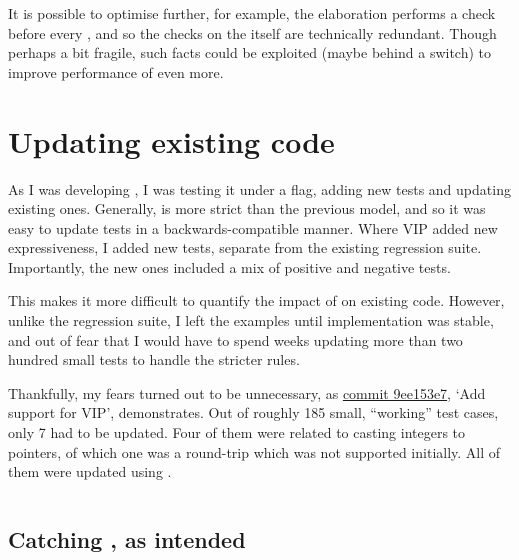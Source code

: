 It is possible to optimise further, for example, the  elaboration
performs a  check before every
, and so the checks on the 
itself are technically redundant. Though perhaps a bit fragile, such facts
could be exploited (maybe behind a switch) to improve performance of
 even more.

\section{Updating existing code}

As I was developing , I was testing it under a flag, adding new
tests and updating existing ones. Generally,  is more strict than
the previous model, and so it was easy to update tests in a
backwards-compatible manner. Where VIP added new expressiveness, I added new
tests, separate from the existing regression suite. Importantly, the new ones
included a mix of positive and negative tests.

This makes it more difficult to quantify the impact of  on existing
code. However, unlike the regression suite, I left the 
examples until implementation was stable, and out of fear that I would have to
spend weeks updating more than two hundred small tests to handle the stricter
rules.

Thankfully, my fears turned out to be unnecessary, as
\href{https://github.com/rems-project/cn-tutorial/commit/9ee153e74d1b0fbdcb2802f2186d211ab6b2343b}{commit
9ee153e7}, `Add support for VIP', demonstrates. Out of roughly 185 small,
``working'' test cases, only 7 had to be updated. Four of them were
related to casting integers to pointers, of which one was a round-trip which
was not supported initially. All of them were updated using
.

\inputminted[fontsize=\footnotesize,breaklines,firstline=10,lastline=68]{diff}{code/add_support_for_vip.patch}

\subsection{Catching , as intended}

